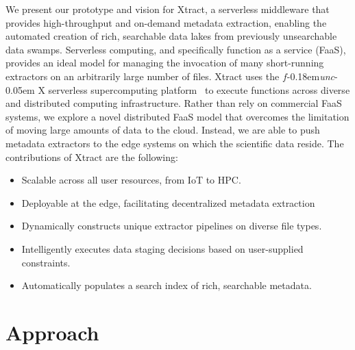 \documentclass[sigconf, 9pt]{acmart}
\newcommand{\kyle}[1]{}
\newcommand{\kyle}[1]{{\textcolor{purple}{ Kyle: #1 }}}
\newcommand{\name}{Xtract}
\newcommand{\funcx}{$f$\kern-0.18em\emph{unc}\kern-0.05em X}
\begin{document}
We present our prototype and vision for \name{},
a serverless middleware that provides high-throughput and on-demand metadata 
extraction, enabling the automated creation of rich, searchable data lakes from previously unsearchable data swamps. 
Serverless computing, and specifically function as a service (FaaS),
provides an ideal model for managing the invocation of
many short-running extractors on an arbitrarily large number of files. 
\name{} uses the \funcx{} serverless supercomputing platform~\cite{chard2019serverless}
to execute functions across diverse and distributed computing infrastructure.
Rather than rely on commercial FaaS systems, we explore a novel distributed FaaS model 
that overcomes the limitation of moving large amounts of data to the cloud. 
Instead, we are able to push
metadata extractors to the edge systems on which the scientific data reside. 
The contributions of \name{} are the following: 
\begin{itemize}
\item Scalable across all user resources, from IoT to HPC. 
\item Deployable at the edge, facilitating decentralized metadata extraction
\item Dynamically constructs unique extractor pipelines on diverse file types. 
\item Intelligently executes data staging decisions based on user-supplied constraints. 
\item Automatically populates a search index of rich, searchable metadata. 
\end{itemize}





\section{Approach}
\label{sec:approach}
\end{document}
